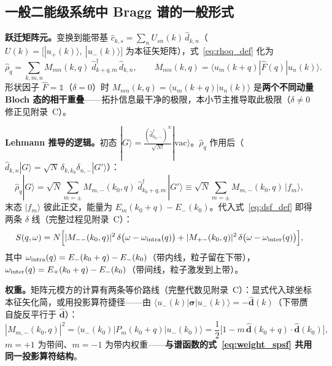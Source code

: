 \documentclass[onecolumn,aps,prl,superscriptaddress,longbibliography]{revtex4-2}
\begin{document}
\subsection{一般二能级系统中 Bragg 谱的一般形式}\label{sec:bragg_form}

\textbf{跃迁矩阵元。}变换到能带基 $\hat{c}_{k,s} = \sum_n U_{sn}(k)\,\hat{d}_{k,n}$（$U(k) = \big[|u_+(k)\rangle,\ |u_-(k)\rangle\big]$ 为本征矢矩阵），式~\eqref{eq:rhoq_def} 化为
\begin{equation}\label{eq:bandbasis}
\hat{\rho}_q = \sum_{k,m,n} M_{mn}(k,q)\;\hat{d}^\dagger_{k+q,m}\,\hat{d}_{k,n},
\qquad
M_{mn}(k,q) = \langle u_m(k+q)|\hat{F}(q)|u_n(k)\rangle.
\end{equation}
形状因子 $\hat F = \mathbb{1}$（$\delta = 0$）时 $M_{mn}(k,q) = \langle u_m(k+q)|u_n(k)\rangle$ 是\textbf{两个不同动量 Bloch 态的相干重叠}——拓扑信息最干净的极限，本小节主推导取此极限（$\delta\neq0$ 修正见附录~C）。

\textbf{Lehmann 推导的逻辑。}初态 $|G\rangle = \frac{(\hat{d}^\dagger_{k_0,-})^N}{\sqrt{N!}}|\mathrm{vac}\rangle$。$\hat{\rho}_q$ 作用后（$\hat d_{k,n}|G\rangle = \sqrt{N}\,\delta_{k,k_0}\delta_{n,-}|G'\rangle$）：
\begin{equation}\label{eq:action}
\hat{\rho}_q|G\rangle = \sqrt{N}\sum_{m=\pm} M_{m,-}(k_0,q)\;\hat{d}^\dagger_{k_0+q,m}\,|G'\rangle \equiv \sqrt{N}\sum_{m=\pm} M_{m,-}(k_0,q)\,|f_m\rangle,
\end{equation}
末态 $|f_m\rangle$ 彼此正交，能量为 $E_m(k_0+q) - E_-(k_0)$。代入式~\eqref{eq:dsf_def} 即得两条 $\delta$ 线（完整过程见附录~C）：
\begin{equation}\label{eq:bragg_two_lines}
S(q,\omega) = N\Big[|M_{--}(k_0,q)|^2\,\delta\big(\omega - \omega_{\rm intra}(q)\big) + |M_{+-}(k_0,q)|^2\,\delta\big(\omega - \omega_{\rm inter}(q)\big)\Big],
\end{equation}
其中 $\omega_{\rm intra}(q) = E_-(k_0+q) - E_-(k_0)$（带内线，粒子留在下带），$\omega_{\rm inter}(q) = E_+(k_0+q) - E_-(k_0)$（带间线，粒子激发到上带）。

\textbf{权重。}矩阵元模方的计算有两条等价路线（完整代数见附录~C）：显式代入球坐标本征矢化简，或用投影算符捷径——由 $\langle u_-(k)|\symbf{\sigma}|u_-(k)\rangle = -\hat{\mathbf{d}}(k)$（下带赝自旋反平行于 $\hat{\mathbf{d}}$）：
\begin{equation}\label{eq:projector_shortcut}
|M_{m,-}(k_0,q)|^2 = \langle u_-(k_0)|P_m(k_0+q)|u_-(k_0)\rangle
= \frac{1}{2}\Big[1 - m\,\hat{\mathbf{d}}(k_0+q)\cdot\hat{\mathbf{d}}(k_0)\Big],
\end{equation}
$m = +1$ 为带间、$m = -1$ 为带内权重——\textbf{与谱函数的式~\eqref{eq:weight_spsf} 共用同一投影算符结构}。
\end{document}

